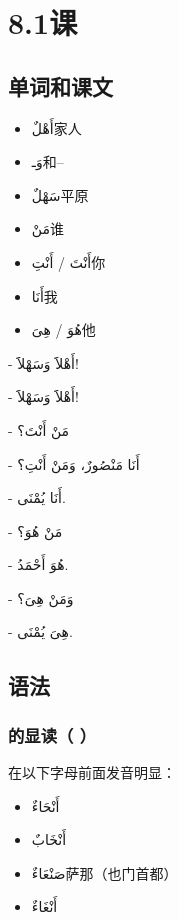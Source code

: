 \chapter{8.1课}

\section{单词和课文}

\begin{itemize}
    \item \ac{أَهْلٌ}{家人}
    \item \ac{وَـ}{和--}
    \item \ac{سَهْلٌ}{平原}
    \item \ac{مَنْ}{谁}
    \item \ac{أَنْتَ / أَنْتِ}{你}
    \item \ac{أَنَا}{我}
    \item \ac{هُوَ / هِىَ}{他}
\end{itemize}

\begin{Arabic}
    - أَهْلاََ وَسَهْلاََ!

    - أَهْلاََ وَسَهْلاََ!

    - مَنْ أَنْتَ؟

    - أَنَا مَنْصُورٌ، وَمَنْ أَنْتِ؟

    - أَنَا يُمْنَى.

    - مَنْ هُوَ؟

    - هُوَ أَحْمَدُ.

    - وَمَنْ هِىَ؟

    - هِىَ يُمْنَى.
\end{Arabic}

\section{语法}


\subsection{ 的显读（ ）}

 在以下字母前面发音明显：

\begin{itemize}
    \item \ac{أَنْحَاءٌ}{}
    \item \ac{أَنْخَابٌ}{}
    \item \ac{صَنْعَاءٌ}{萨那（也门首都）}
    \item \ac{أَنْغَاءٌ}{}
\end{itemize}

